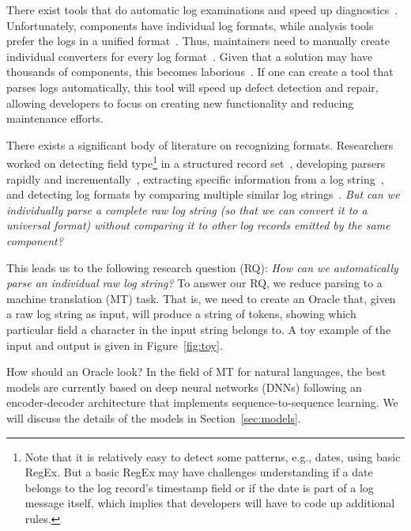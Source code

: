 \documentclass{article}
\begin{document}
There exist tools that do automatic log examinations and speed up diagnostics~\cite{DBLP:journals/jss/MurtazaHMG14,DBLP:conf/sigsoft/MiranskyyMGDWG07,DBLP:conf/icse/BeschastnikhBEK14,DBLP:journals/tse/MarianiPS17}. Unfortunately, components have individual log formats, while analysis tools prefer the logs in a unified format~\cite{DBLP:journals/software/MiranskyyHCL16}. Thus, maintainers need to manually create individual converters for every log format~\cite{DBLP:conf/icws/HeZZL17}. Given that a solution may have thousands of components, this becomes laborious~\cite{DBLP:journals/software/MiranskyyHCL16,DBLP:conf/iwpc/MessaoudiPBBS18}. If one can create a tool that parses logs automatically,  this tool will speed up defect detection and repair, allowing developers to focus on creating new functionality and reducing maintenance efforts. 

There exists a significant body of literature on recognizing formats. Researchers worked on detecting field type\footnote{Note that it is relatively easy to detect some patterns, e.g., dates, using basic RegEx. But a basic RegEx may have challenges understanding if a date belongs to the log record's timestamp field or if the date is part of a log message itself, which implies that developers will have to code up additional rules. } in a structured record set~\cite{DBLP:conf/kdd/HulsebosHBZSKDH19}, developing parsers rapidly and incrementally~\cite{DBLP:conf/csmr/NierstraszKGLB07}, extracting specific information from a log string~\cite{DBLP:conf/icdm/FuLWL09,DBLP:journals/tkde/MakanjuZM12,DBLP:conf/icws/HeZZL17,DBLP:conf/IEEEares/DernaikaCCR19}, and detecting log formats by comparing multiple similar log strings~\cite{DBLP:conf/icdm/Du016,DBLP:conf/iwpc/MessaoudiPBBS18,DBLP:journals/infsof/El-MasriPGHB20}. \textit{But can we individually parse a complete raw log string  (so that we can convert it to a universal format) without comparing it to other log records emitted by the same component? }

This leads us to the following research question (RQ): \textit{How can we automatically parse an individual raw log string?} To answer our RQ, we reduce parsing to a machine translation (MT) task. That is, we need to create an Oracle that, given a raw log string as input, will produce a string of tokens, showing which particular field a character in the input string belongs to. A toy example of the input and output is given in Figure~\ref{fig:toy}.

How should an Oracle look? In the field of MT for natural languages,  the best models are currently based on deep neural networks (DNNs) following an encoder-decoder architecture that implements sequence-to-sequence learning.  We will discuss the details of the models in Section~\ref{sec:models}.
\end{document}
